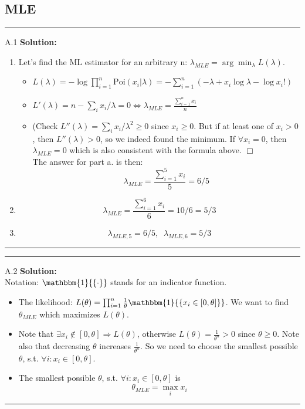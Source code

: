 \documentclass{article}
\newcommand{\1}{\mathbf{1}}
\newcommand{\I}{\mathbbm{1}}
\begin{document}
\subsection*{MLE}
\noindent\rule{\textwidth}{1pt}
A.1 {\bf Solution:}\\
\begin{enumerate}
    \item Let's find the ML estimator for an arbitrary n: $\lambda_{MLE} = \arg\min_\lambda L(\lambda)$.
    \begin{itemize}
        \item $L(\lambda) = -\log \prod_{i=1}^n \mathrm{Poi}(x_i|\lambda) =  -\sum_{i=1}^n (-\lambda +  x_i\log \lambda - \log x_i!)$
        \item $L'(\lambda) = n - \sum_i x_i/\lambda = 0 \Leftrightarrow \boxed{\lambda_{MLE} = \frac{\sum_{i=1}^n x_i}{n}}$
        \item (Check $L''(\lambda) = \sum_i x_i/\lambda^2 \ge 0$ since $x_i \ge 0$. But if at least one of $x_i > 0$, then $L''(\lambda) > 0$, so we indeed found the minimum. If $\forall x_i = 0$, then $\lambda_{MLE} = 0$ which is also consistent with the formula above. $\Box$
        \\
        The answer for part a. is then: $$\boxed{\lambda_{MLE} = \frac{\sum_{i=1}^5 x_i}{5} = 6/5}$$
    \end{itemize}
    \item $$\boxed{\lambda_{MLE} = \frac{\sum_{i=1}^6 x_i}{6} = 10/6 = 5/3}$$
    \item $$\boxed{\lambda_{MLE, 5} = 6/5, \; \; \lambda_{MLE, 6} = 5/3}$$
    
\end{enumerate}

\noindent\rule{\textwidth}{1pt}

\noindent\rule{\textwidth}{1pt}
A.2 {\bf Solution:}\\
Notation: $\I{\{\cdot\}}$ stands for an indicator function.\\
\begin{itemize}
    \item The likelihood: $L(\theta) = \prod_{i=1}^n \frac{1}{\theta}\I{\{ x_i \in [0,\theta]\}}$. We want to find $\theta_{MLE}$ which maximizes $L(\theta).$
    \item Note that $\exists x_i \not \in [0,\theta] \Rightarrow L(\theta)$, otherwise $L(\theta) = \frac{1}{\theta^n} > 0$ since $\theta \ge 0$. Note also that decreasing $\theta$ increases $\frac{1}{\theta^n}$. So we need to choose the smallest possible $\theta$, s.t. $\forall i: x_i \in [0,\theta]$.
    \item The smallest possible $\theta$, s.t. $\forall i: x_i \in [0,\theta]$ is $$
    \boxed{ \theta_{MLE} = \max_i x_i }$$
\end{itemize}
\noindent\rule{\textwidth}{1pt}
\end{document}
